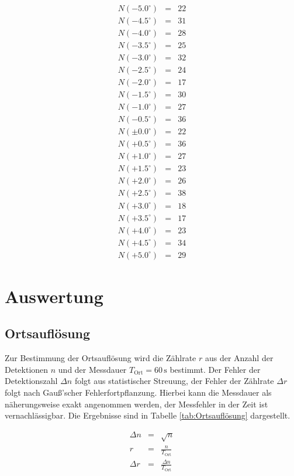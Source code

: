 \documentclass[12pt,a4paper]{scrartcl}
\numberwithin{equation}{section} %
\renewcommand{\[}{} %
\renewcommand{\]}{\noindent} %
\begin{document}
\[
\begin{eqnarray*}
    N(-5.0^\circ) &=& 22 \\
    N(-4.5^\circ) &=& 31 \\
    N(-4.0^\circ) &=& 28 \\
    N(-3.5^\circ) &=& 25 \\
    N(-3.0^\circ) &=& 32 \\
    N(-2.5^\circ) &=& 24 \\
    N(-2.0^\circ) &=& 17 \\
    N(-1.5^\circ) &=& 30 \\
    N(-1.0^\circ) &=& 27 \\
    N(-0.5^\circ) &=& 36 \\
    N(\pm0.0^\circ) &=& 22 \\
    N(+0.5^\circ) &=& 36 \\
    N(+1.0^\circ) &=& 27 \\
    N(+1.5^\circ) &=& 23 \\
    N(+2.0^\circ) &=& 26 \\
    N(+2.5^\circ) &=& 38 \\
    N(+3.0^\circ) &=& 18 \\
    N(+3.5^\circ) &=& 17 \\
    N(+4.0^\circ) &=& 23 \\
    N(+4.5^\circ) &=& 34 \\
    N(+5.0^\circ) &=& 29
\end{eqnarray*}
\]

\clearpage
\hypertarget{auswertung}{%
\section{Auswertung}\label{auswertung}}
\hypertarget{auswertung-ortsaufluxf6sung}{\subsection{Ortsauflösung}\label{auswertung-ortsaufluxf6sung}}
Zur Bestimmung der Ortsauflösung wird die Zählrate $r$ aus der Anzahl der Detektionen $n$ und der Messdauer $T_\mathrm{Ort}=60\,\mathrm{s}$ bestimmt. Der Fehler der Detektionszahl $\Delta n$ folgt aus statistischer Streuung, der Fehler der Zählrate $\Delta r$ folgt nach Gauß'scher Fehlerfortpflanzung. Hierbei kann die Messdauer als näherungsweise exakt angenommen werden, der Messfehler in der Zeit ist vernachlässigbar. Die Ergebnisse sind in Tabelle \ref{tab:Ortsauflösung} dargestellt.

\begin{eqnarray}
	\Delta n &=& \sqrt{n} \label{eq:Delta n} \\
	r &=& \frac{n}{T_\mathrm{Ort}} \label{eq:Zählrate} \\
	\Delta r &=& \frac{\Delta n}{T_\mathrm{Ort}}
\end{eqnarray}
\end{document}
